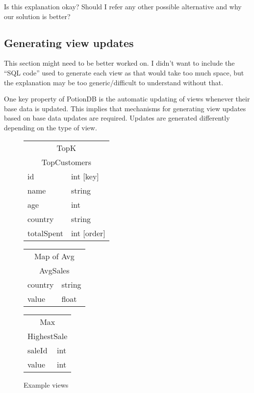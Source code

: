 \documentclass{vldb}
\newcommand{\grumbler}[2]{{\color{red}{\bf #1:} #2}}
\newcommand{\andre}[1]{\grumbler{andre}{#1}}
\begin{document}
\andre{Is this explanation okay? Should I refer any other possible alternative and why our solution is better?}

\subsection{Generating view updates}

\andre{This section might need to be better worked on. I didn't want to include the ``SQL code'' used to generate each view as that would take too much space, but the explanation may be too generic/difficult to understand without that.}

One key property of PotionDB is the automatic updating of views whenever their base data is updated.
This implies that mechanisms for generating view updates based on base data updates are required.
Updates are generated differently depending on the type of view.

\begin{figure}
	\centering
	\begin{tabular}{|l|l|}
		\multicolumn{2}{c}{TopK} \\
		\multicolumn{2}{c}{TopCustomers} \\ \hline
		id            & int [key]         \\ \hline
		name          & string       \\ \hline
		age           & int          \\ \hline
		country       & string      \\ \hline
		totalSpent & int [order] \\
		\hline
	\end{tabular} \hspace{0.1em}
	\begin{tabular}{|l|l|}
			\multicolumn{2}{c}{Map of Avg} \\
			\multicolumn{2}{c}{AvgSales} \\ \hline
			country & string \\ \hline
			value        & float  \\
			\hline       
	\end{tabular} \hspace{0.1em}
	\begin{tabular}{|l|l|}
		\multicolumn{2}{c}{Max} \\
		\multicolumn{2}{c}{HighestSale} \\ \hline
		saleId & int \\ \hline
		value & int \\
		\hline      
	\end{tabular}
	\caption{Example views}
	\label{fig:views}
\end{figure}
\end{document}
